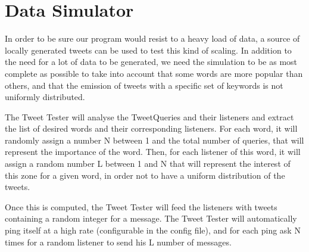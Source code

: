 \section{Data Simulator}

In order to be sure our program would resist to a heavy load of data, a source of locally generated tweets can be used to test this kind of scaling. In addition to the need for a lot of data to be generated, we need the simulation to be as most complete as possible to take into account that some words are more popular than others, and that the emission of tweets with a specific set of keywords is not uniformly distributed.

The Tweet Tester will analyse the TweetQueries and their listeners and extract the list of desired words and their corresponding listeners. For each word, it will randomly assign a number N between 1 and the total number of queries, that will represent the importance of the word. Then, for each listener of this word, it will assign a random number L between 1 and N that will represent the interest of this zone for a given word, in order not to have a uniform distribution of the tweets.

Once this is computed, the Tweet Tester will feed the listeners with tweets containing a random integer for a message. The Tweet Tester will automatically ping itself at a high rate (configurable in the config file), and for each ping ask N times for a random listener to send his L number of messages.
